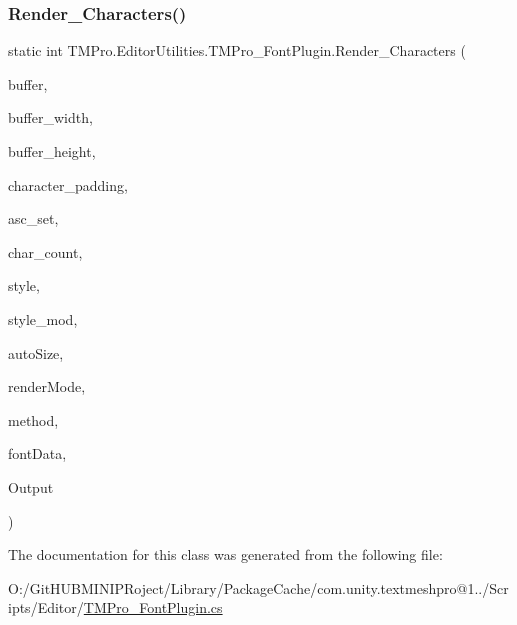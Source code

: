 \mbox{\label{class_t_m_pro_1_1_editor_utilities_1_1_t_m_pro___font_plugin_a04c37eb7d380c3116b123e91f02ab93c}} 
\subsubsection{\texorpdfstring{Render\_Characters()}{Render\_Characters()}}
{\footnotesize\ttfamily static int T\+M\+Pro.\+Editor\+Utilities.\+T\+M\+Pro\+\_\+\+Font\+Plugin.\+Render\+\_\+\+Characters (\begin{DoxyParamCaption}\item[{byte \mbox{[}$\,$\mbox{]}}]{buffer,  }\item[{int}]{buffer\+\_\+width,  }\item[{int}]{buffer\+\_\+height,  }\item[{int}]{character\+\_\+padding,  }\item[{int \mbox{[}$\,$\mbox{]}}]{asc\+\_\+set,  }\item[{int}]{char\+\_\+count,  }\item[{\mbox{\hyperlink{namespace_t_m_pro_1_1_editor_utilities_ae783a93ab603d30fd45ab0e3f3c67394}{Face\+Styles}}}]{style,  }\item[{float}]{style\+\_\+mod,  }\item[{bool}]{auto\+Size,  }\item[{\mbox{\hyperlink{namespace_t_m_pro_1_1_editor_utilities_ac956f92fd288b0b627522e75a9c5b9ad}{Render\+Modes}}}]{render\+Mode,  }\item[{int}]{method,  }\item[{ref \mbox{\hyperlink{struct_t_m_pro_1_1_editor_utilities_1_1_f_t___face_info}{F\+T\+\_\+\+Face\+Info}}}]{font\+Data,  }\item[{\mbox{\hyperlink{struct_t_m_pro_1_1_editor_utilities_1_1_f_t___glyph_info}{F\+T\+\_\+\+Glyph\+Info}} \mbox{[}$\,$\mbox{]}}]{Output }\end{DoxyParamCaption})}



The documentation for this class was generated from the following file\+:\begin{DoxyCompactItemize}
\item 
O\+:/\+Git\+H\+U\+B\+M\+I\+N\+I\+P\+Roject/\+Library/\+Package\+Cache/com.\+unity.\+textmeshpro@1../\+Scripts/\+Editor/\mbox{\hyperlink{_t_m_pro___font_plugin_8cs}{T\+M\+Pro\+\_\+\+Font\+Plugin.\+cs}}\end{DoxyCompactItemize}
